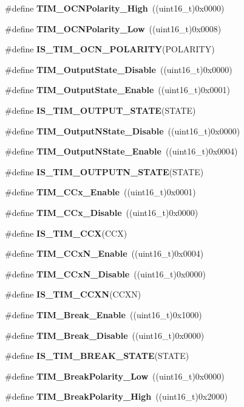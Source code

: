 \begin{DoxyCompactItemize}
\item 
\#define \textbf{ T\+I\+M\+\_\+\+O\+C\+N\+Polarity\+\_\+\+High}~((uint16\+\_\+t)0x0000)
\item 
\#define \textbf{ T\+I\+M\+\_\+\+O\+C\+N\+Polarity\+\_\+\+Low}~((uint16\+\_\+t)0x0008)
\item 
\#define \textbf{ I\+S\+\_\+\+T\+I\+M\+\_\+\+O\+C\+N\+\_\+\+P\+O\+L\+A\+R\+I\+TY}(P\+O\+L\+A\+R\+I\+TY)
\item 
\#define \textbf{ T\+I\+M\+\_\+\+Output\+State\+\_\+\+Disable}~((uint16\+\_\+t)0x0000)
\item 
\#define \textbf{ T\+I\+M\+\_\+\+Output\+State\+\_\+\+Enable}~((uint16\+\_\+t)0x0001)
\item 
\#define \textbf{ I\+S\+\_\+\+T\+I\+M\+\_\+\+O\+U\+T\+P\+U\+T\+\_\+\+S\+T\+A\+TE}(S\+T\+A\+TE)
\item 
\#define \textbf{ T\+I\+M\+\_\+\+Output\+N\+State\+\_\+\+Disable}~((uint16\+\_\+t)0x0000)
\item 
\#define \textbf{ T\+I\+M\+\_\+\+Output\+N\+State\+\_\+\+Enable}~((uint16\+\_\+t)0x0004)
\item 
\#define \textbf{ I\+S\+\_\+\+T\+I\+M\+\_\+\+O\+U\+T\+P\+U\+T\+N\+\_\+\+S\+T\+A\+TE}(S\+T\+A\+TE)
\item 
\#define \textbf{ T\+I\+M\+\_\+\+C\+Cx\+\_\+\+Enable}~((uint16\+\_\+t)0x0001)
\item 
\#define \textbf{ T\+I\+M\+\_\+\+C\+Cx\+\_\+\+Disable}~((uint16\+\_\+t)0x0000)
\item 
\#define \textbf{ I\+S\+\_\+\+T\+I\+M\+\_\+\+C\+CX}(C\+CX)
\item 
\#define \textbf{ T\+I\+M\+\_\+\+C\+Cx\+N\+\_\+\+Enable}~((uint16\+\_\+t)0x0004)
\item 
\#define \textbf{ T\+I\+M\+\_\+\+C\+Cx\+N\+\_\+\+Disable}~((uint16\+\_\+t)0x0000)
\item 
\#define \textbf{ I\+S\+\_\+\+T\+I\+M\+\_\+\+C\+C\+XN}(C\+C\+XN)
\item 
\#define \textbf{ T\+I\+M\+\_\+\+Break\+\_\+\+Enable}~((uint16\+\_\+t)0x1000)
\item 
\#define \textbf{ T\+I\+M\+\_\+\+Break\+\_\+\+Disable}~((uint16\+\_\+t)0x0000)
\item 
\#define \textbf{ I\+S\+\_\+\+T\+I\+M\+\_\+\+B\+R\+E\+A\+K\+\_\+\+S\+T\+A\+TE}(S\+T\+A\+TE)
\item 
\#define \textbf{ T\+I\+M\+\_\+\+Break\+Polarity\+\_\+\+Low}~((uint16\+\_\+t)0x0000)
\item 
\#define \textbf{ T\+I\+M\+\_\+\+Break\+Polarity\+\_\+\+High}~((uint16\+\_\+t)0x2000)

\end{DoxyCompactItemize}
